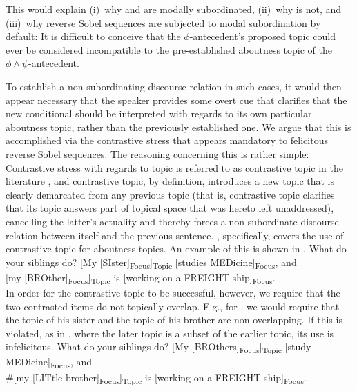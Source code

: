 This would explain (i)~why  and  are modally subordinated, (ii)~why  is not, and (iii)~why reverse Sobel sequences are subjected to modal subordination by default: It is difficult to conceive that the $\phi$-antecedent's proposed topic could ever be considered incompatible to the pre-established aboutness topic of the $\phi\land\psi$-antecedent.

To establish a non-subordinating discourse relation in such cases, it would then appear necessary that the speaker provides some overt cue that clarifies that the new conditional should be interpreted with regards to its own particular aboutness topic, rather than the previously established one. We argue that this is accomplished via the contrastive stress that appears mandatory to felicitous reverse Sobel sequences. The reasoning concerning this is rather simple: Contrastive stress with regards to topic is referred to as contrastive topic in the literature \parencite{Buring1997,Buring2003,Krifka2007,Buring2016,Constant2012}, and contrastive topic, by definition, introduces a new topic that is clearly demarcated from any previous topic (that is, contrastive topic clarifies that its topic answers part of topical space that was hereto left unaddressed), cancelling the latter's actuality \parencite{Ebert2008,Krifka2007,Ebert2014,Lee2017,vanRooij2017,Yabushita2017} and thereby forces a non-subordinate discourse relation between itself and the previous sentence. \textcite[p.~44ff]{Krifka2007}, specifically, covers the use of contrastive topic for aboutness topics. An example of this is shown in .
\pex[nopreamble=true]\label{ex:krifka-cs}%
\a{} {}What do your siblings do?
\a{} {}[My [\MakeUppercase{si}ster]\textsubscript{Focus}]\textsubscript{Topic} [studies \MakeUppercase{med}icine]\textsubscript{Focus},
and\\[my [\MakeUppercase{bro}ther]\textsubscript{Focus}]\textsubscript{Topic} is [working on a \MakeUppercase{freight} ship]\textsubscript{Focus}.\\\emptyfill\parencite[adapted from][p.~44]{Krifka2007}
\xe
In order for the contrastive topic to be successful, however, we require that the two contrasted items do not topically overlap. E.g., for , we would require that the topic of his sister and the topic of his brother are non-overlapping. If this is violated, as in , where the later topic is a subset of the earlier topic, its use is infelicitous.
\pex[nopreamble=true]\label{ex:krifka-cs-bad}%
\a{} {}What do your siblings do?
\a{} {}\phantom{\#}[My [\MakeUppercase{bro}thers]\textsubscript{Focus}]\textsubscript{Topic} [study \MakeUppercase{med}icine]\textsubscript{Focus},
and\\\#[my [\MakeUppercase{lit}tle brother]\textsubscript{Focus}]\textsubscript{Topic} is [working on a \MakeUppercase{freight} ship]\textsubscript{Focus}.\\\emptyfill\parencite[p.~267]{Krifka2007}
\xe

